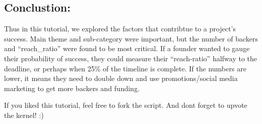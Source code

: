 \documentclass[]{article}
\begin{document}
\subsection{\texorpdfstring{{Conclustion:}}{Conclustion:}}\label{conclustion}

Thus in this tutorial, we explored the factors that contribtue to a
project's success. Main theme and sub-category were important, but the
number of backers and ``reach\_ratio'' were found to be most critical.
If a founder wanted to gauge their probability of success, they could
measure their ``reach-ratio'' halfway to the deadline, or perhaps when
25\% of the timeline is complete. If the numbers are lower, it means
they need to double down and use promotions/social media marketing to
get more backers and funding.

If you liked this tutorial, feel free to fork the script. And dont
forget to upvote the kernel! :)
\end{document}
